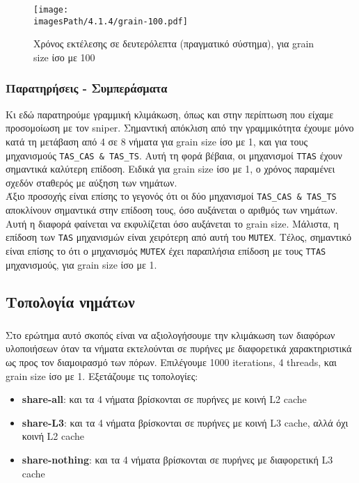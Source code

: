 \documentclass[12pt,a4paper]{article}
\newcommand{\imagesPath}{/home/nick/arch-ntua/ex03/graphs}
\newcommand{\myWidth}{0.8\linewidth}
\begin{document}
				\begin{figure}[H]
					\begin{center}
						\texttt{[image: \\imagesPath/4.1.4/grain-100.pdf]}
						\caption{Χρόνος εκτέλεσης σε δευτερόλεπτα (πραγματικό σύστημα), για grain size ίσο με 100}
					\end{center}
				\end{figure}
			
			\subsubsection*{Παρατηρήσεις - Συμπεράσματα}
				Κι εδώ παρατηρούμε γραμμική κλιμάκωση, όπως και στην περίπτωση που είχαμε προσομοίωση με τον sniper. Σημαντική απόκλιση από την γραμμικότητα έχουμε μόνο κατά τη μετάβαση από 4 σε 8 νήματα για grain size ίσο με 1, και για τους μηχανισμούς \verb|TAS_CAS & TAS_TS|. Αυτή τη φορά βέβαια, οι μηχανισμοί \verb|TTAS| έχουν σημαντικά καλύτερη επίδοση. Ειδικά για grain size ίσο με 1, ο χρόνος παραμένει σχεδόν σταθερός με αύξηση των νημάτων. \\
				
				Άξιο προσοχής είναι επίσης το γεγονός ότι οι δύο μηχανισμοί \verb|TAS_CAS & TAS_TS| αποκλίνουν σημαντικά στην επίδοση τους, όσο αυξάνεται ο αριθμός των νημάτων. Αυτή η διαφορά φαίνεται να εκφυλίζεται όσο αυξάνεται το grain size. Μάλιστα, η επίδοση των \verb|TAS| μηχανισμών είναι χειρότερη από αυτή του \verb|MUTEX|. Τέλος, σημαντικό είναι επίσης το ότι ο μηχανισμός \verb|MUTEX| έχει παραπλήσια επίδοση με τους \verb|TTAS| μηχανισμούς, για grain size ίσο με 1. \\
				
		\subsection{Τοπολογία νημάτων}
			
			\subsubsection{}
				Στο ερώτημα αυτό σκοπός είναι να αξιολογήσουμε την κλιμάκωση των διαφόρων υλοποιήσεων όταν τα νήματα εκτελούνται σε πυρήνες με διαφορετικά χαρακτηριστικά ως προς τον διαμοιρασμό των πόρων. Επιλέγουμε 1000 iterations, 4 threads, και grain size ίσο με 1. Εξετάζουμε τις τοπολογίες:
				
				\begin{itemize}
					\item \textbf{share-all}: και τα 4 νήματα βρίσκονται σε πυρήνες με κοινή L2 cache
					\item \textbf{share-L3}: και τα 4 νήματα βρίσκονται σε πυρήνες με κοινή L3 cache, αλλά όχι κοινή L2 cache
					\item \textbf{share-nothing}: και τα 4 νήματα βρίσκονται σε πυρήνες με διαφορετική L3 cache
				\end{itemize}
				
\end{document}
